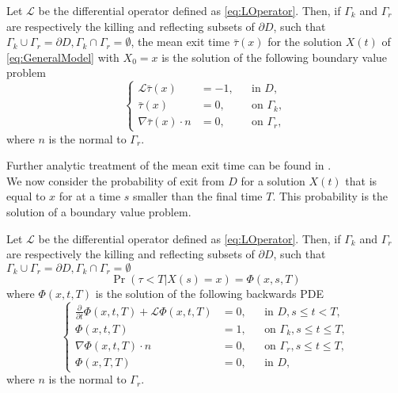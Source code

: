 \begin{theorem} Let $\mathcal L$ be the differential operator defined as \eqref{eq:LOperator}. Then, if $\Gamma_k$ and $\Gamma_r$ are respectively the killing and reflecting subsets of $\partial D$, such that $\Gamma_k \cup \Gamma_r = \partial D, \Gamma_k \cap \Gamma_r = \emptyset$, the mean exit time $\bar \tau(x)$ for the solution $X(t)$ of \eqref{eq:GeneralModel} with $X_0 = x$ is the solution of the following boundary value problem
\begin{equation}\label{eq:PDETau}
\left \{
\begin{aligned}
	\mathcal L \bar \tau(x) &= -1, && \text{in } D, \\
	\bar\tau(x) &= 0, && \text{on } \Gamma_k, \\
	\nabla \bar\tau(x) \cdot n &= 0, && \text{on } \Gamma_r,
\end{aligned} \right .
\end{equation}
where $n$ is the normal to $\Gamma_r$.
\end{theorem}
\noindent Further analytic treatment of the mean exit time can be found in \cite{Krumscheid2015,Pavliotis2014}. \\
We now consider the probability of exit from $D$ for a solution $X(t)$ that is equal to $x$ for at a time $s$ smaller than the final time $T$. This probability is the solution of a boundary value problem.
\begin{theorem} Let $\mathcal L$ be the differential operator defined as \eqref{eq:LOperator}. Then, if $\Gamma_k$ and $\Gamma_r$ are respectively the killing and reflecting subsets of $\partial D$, such that $\Gamma_k \cup \Gamma_r = \partial D, \Gamma_k \cap \Gamma_r = \emptyset$
\begin{equation}\label{eq:ExitProbNotation}
	\Pr(\tau < T | X(s) = x) = \Phi(x,s,T) 
\end{equation}
where $\Phi(x,t,T)$ is the solution of the following backwards PDE
\begin{equation}\label{eq:PDEPhi}
\left \{
\begin{aligned}
	\frac{\partial}{\partial t} \Phi(x,t,T) + \mathcal L \Phi(x,t,T) &= 0, && \text{in } D, s \leq t < T, \\
	\Phi(x,t,T) &= 1, && \text{on } \Gamma_k, s \leq t \leq T,\\
	\nabla \Phi(x,t,T) \cdot n &= 0, && \text{on } \Gamma_r, s \leq t \leq T, \\
	\Phi(x,T,T) &= 0, && \text{in } D,
\end{aligned} \right .
\end{equation}
where $n$ is the normal to $\Gamma_r$.
\end{theorem}
